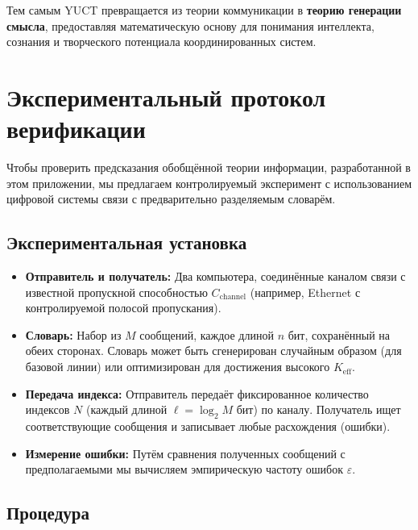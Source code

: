 \documentclass[12pt,a4paper]{article}
\theoremstyle{remark}
\newcommand{\Keff}{K_{\mathrm{eff}}}
\begin{document}
	Тем самым YUCT превращается из теории коммуникации в \textbf{теорию генерации смысла}, предоставляя математическую основу для понимания интеллекта, сознания и творческого потенциала координированных систем.
	
	\section{Экспериментальный протокол верификации}
	\label{sec:experiment}
	
	Чтобы проверить предсказания обобщённой теории информации, разработанной в этом приложении, мы предлагаем контролируемый эксперимент с использованием цифровой системы связи с предварительно разделяемым словарём.
	
	\subsection{Экспериментальная установка}
	
	\begin{itemize}
		\item \textbf{Отправитель и получатель:} Два компьютера, соединённые каналом связи с известной пропускной способностью $C_{\text{channel}}$ (например, Ethernet с контролируемой полосой пропускания).
		\item \textbf{Словарь:} Набор из $M$ сообщений, каждое длиной $n$ бит, сохранённый на обеих сторонах. Словарь может быть сгенерирован случайным образом (для базовой линии) или оптимизирован для достижения высокого $\Keff$.
		\item \textbf{Передача индекса:} Отправитель передаёт фиксированное количество индексов $N$ (каждый длиной $\ell = \log_2 M$ бит) по каналу. Получатель ищет соответствующие сообщения и записывает любые расхождения (ошибки).
		\item \textbf{Измерение ошибки:} Путём сравнения полученных сообщений с предполагаемыми мы вычисляем эмпирическую частоту ошибок $\varepsilon$.
	\end{itemize}
	
	\subsection{Процедура}
	
\end{document}
